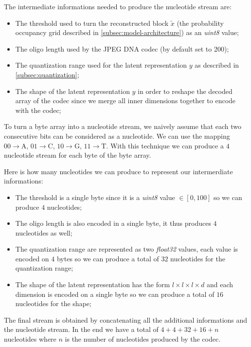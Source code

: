 The intermediate informations needed to produce the nucleotide stream are:
\begin{itemize}
    \item The threshold used to turn the reconstructed block $\tilde{x}$ (the probability occupancy grid described in \ref{subsec:model-architecture}) as an \textit{uint8} value;
    \item The oligo length used by the JPEG DNA codec (by default set to 200);
    \item The quantization range used for the latent representation $y$ as described in \ref{subsec:quantization};
    \item The shape of the latent representation $y$ in order to reshape the decoded array of the codec since we merge all inner dimensions together to encode with the codec;
\end{itemize}

To turn a byte array into a nucleotide stream, we naively assume that each two consecutive bits can be considered as a nucleotide. We can use the mapping  
$00 \rightarrow \text{A}$,
$01 \rightarrow \text{C}$,
$10 \rightarrow \text{G}$,
$11 \rightarrow \text{T}$.
With this technique we can produce a $4$ nucleotide stream for each byte of the byte array.

Here is how many nucleotides we can produce to represent our intermerdiate informations:
\begin{itemize}
    \item The threshold is a single byte since it is a \textit{uint8} value $\in [0, 100]$ so we can produce $4$ nucleotides;
    \item The oligo length is also encoded in a single byte, it thus produces $4$ nucleotides as well;
    \item The quantization range are represented as two \textit{float32} values, each value is encoded on $4$ bytes so we can produce a total of $32$ nucleotides for the quantization range;
    \item The shape of the latent representation has the form $l \times l \times l \times d$ and each dimension is encoded on a single byte so we can produce a total of $16$ nucleotides for the shape;
\end{itemize}

The final stream is obtained by concatenating all the additional informations and the nucleotide stream. In the end we have a total of $4 + 4 + 32 + 16 + n$ nucleotides where $n$ is the number of nucleotides produced by the codec.

